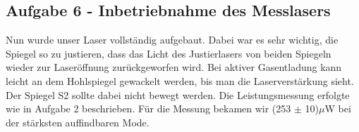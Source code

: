 \subsection{Aufgabe 6 - Inbetriebnahme des Messlasers}

Nun wurde unser Laser vollständig aufgebaut. Dabei war es sehr wichtig, die Spiegel so zu justieren, dass das Licht des Justierlasers von beiden Spiegeln wieder zur Laseröffnung zurückgeworfen wird. Bei aktiver Gasentladung kann leicht an dem Hohlspiegel gewackelt werden, bis man die Laserverstärkung sieht. Der Spiegel S2 sollte dabei nicht bewegt werden. Die Leistungsmessung erfolgte wie in Aufgabe 2 beschrieben.
Für die Messung bekamen wir (253 $\pm$ 10)$\mu$W bei der stärksten auffindbaren Mode. 

